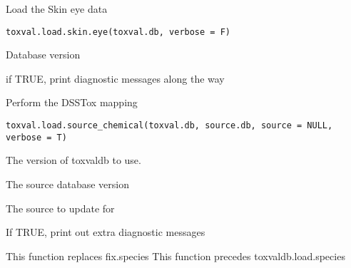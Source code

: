 \documentclass[letterpaper]{book}
\begin{document}
%
\begin{Description}\relax
Load the Skin eye data
\end{Description}
%
\begin{Usage}
\begin{verbatim}
toxval.load.skin.eye(toxval.db, verbose = F)
\end{verbatim}
\end{Usage}
%
\begin{Arguments}
\begin{ldescription}
\item[\code{toxval.db}] Database version

\item[\code{verbose}] if TRUE, print diagnostic messages along the way
\end{ldescription}
\end{Arguments}
%
\begin{Description}\relax
Perform the DSSTox mapping
\end{Description}
%
\begin{Usage}
\begin{verbatim}
toxval.load.source_chemical(toxval.db, source.db, source = NULL, verbose = T)
\end{verbatim}
\end{Usage}
%
\begin{Arguments}
\begin{ldescription}
\item[\code{toxval.db}] The version of toxvaldb to use.

\item[\code{source.db}] The source database version

\item[\code{source}] The source to update for

\item[\code{verbose}] If TRUE, print out extra diagnostic messages
\end{ldescription}
\end{Arguments}
%
\begin{Description}\relax
This function replaces fix.species
This function precedes toxvaldb.load.species
\end{Description}
\end{document}
